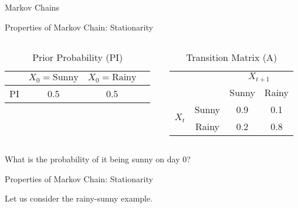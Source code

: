 \documentclass{beamer}
\begin{document}
\begin{section}{Markov Chains}
\begin{frame}{Properties of Markov Chain: Stationarity}
        \begin{columns}[T] %
          \begin{column}{0.48\textwidth} %
            \begin{table}[h]
              \centering
              \caption{Prior Probability (PI)}
              \begin{tabular}{cccc}
                \toprule
                & \(X_0 = \text{Sunny}\) & \(X_0 = \text{Rainy}\) \\
                \midrule
                PI & 0.5 & 0.5 \\
                \bottomrule
              \end{tabular}
            \end{table}
          \end{column}
          \begin{column}{0.48\textwidth} %
            \begin{table}[h]
              \centering
              \caption{Transition Matrix (A)}
              \begin{tabular}{cccc}
                \toprule
                & & \multicolumn{2}{c}{\(X_{t+1}\)} \\
                \cmidrule{3-4}
                & & Sunny & Rainy \\
                \midrule
                \multirow{2}{*}{\(X_t\)} & Sunny & 0.9 & 0.1 \\
                & Rainy & 0.2 & 0.8 \\
                \bottomrule
              \end{tabular}
            \end{table}
          \end{column}
        \end{columns}

        \pause What is the probability of it being sunny on day 0?

      \end{frame}

      \begin{frame}{Properties of Markov Chain: Stationarity}

        Let us consider the rainy-sunny example.
      

\end{frame}
\end{section}
\end{document}
